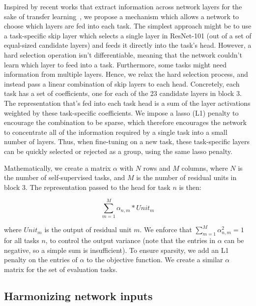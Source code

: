 \documentclass[10pt,twocolumn,letterpaper]{article}
\begin{document}
Inspired by recent works that extract information across network layers for the sake of transfer learning~\cite{misra2016cross,hariharan2015hypercolumns,rusu2016progressive}, we
propose a mechanism which allows a network to choose which layers
are fed into each task.  The simplest approach might be to use a
task-specific skip layer which selects a single layer in ResNet-101
(out of a set of equal-sized candidate layers) and feeds it directly
into the task's head.  However, a hard selection operation isn't
differentiable, meaning that the network couldn't learn which layer to
feed into a task.  Furthermore, some tasks might need information from
multiple layers.  Hence, we relax the hard selection process, and instead pass
a linear combination of skip
layers to each head.  Concretely, each task has a set of coefficients, one for
each of the 23 candidate layers in block 3.  The representation
that's fed into each task head is a sum of the layer activations
weighted by these task-specific coefficients.  We impose a lasso (L1)
penalty to encourage the combination to be sparse, which therefore
encourages the network to concentrate all of the information required
by a single task into a small number of layers.  Thus, when
fine-tuning on a new task, these task-specific layers can be quickly
selected or rejected as a group, using the same lasso penalty.


Mathematically, we create a matrix $\alpha$ with $N$ rows and $M$ columns, where $N$ is the number of self-supervised tasks, and $M$ is the number of residual units in block 3.  
The representation passed to the head for task $n$ is then:


\begin{equation}
    \sum_{m=1}^{M}\alpha_{n,m}*Unit_m
\end{equation}


where $Unit_m$ is the output of residual unit $m$.
We enforce that $\sum_{m=1}^{M}\alpha_{n,m}^{2}=1$ for all tasks $n$, to control the output variance (note that the entries in $\alpha$ can be negative, so a simple sum is insufficient).
To ensure sparsity, we add an L1 penalty on the entries of $\alpha$ to the objective 
function.
We create a similar $\alpha$ matrix for the set of evaluation tasks.


\subsection{Harmonizing network inputs}
\end{document}
